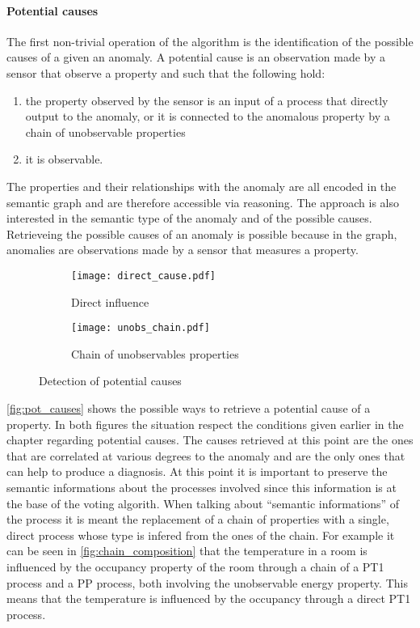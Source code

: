 \paragraph{Potential causes}
The first non-trivial operation of the algorithm is the identification of the possible causes of a given an anomaly. A potential cause is an observation made by a sensor that observe a property and such that the following hold:
\begin{enumerate}
  \item the property observed by the sensor is an input of a process that directly output to the anomaly, or it is connected to the anomalous property by a chain of unobservable properties
  \item it is observable.
\end{enumerate}
The properties and their relationships with the anomaly are all encoded in the semantic graph and are therefore accessible via reasoning. The approach is also interested in the semantic type of the anomaly and of the possible causes.
Retrieveing the possible causes of an anomaly is possible because in the graph, anomalies are observations made by a sensor that measures a property.
\begin{figure}
  \begin{subfigure}[b]{\textwidth}
    \centering
      \texttt{[image: direct\_cause.pdf]}
      \caption{Direct influence}
      \label{fig:direct_influence}
  \end{subfigure}
  \begin{subfigure}[b]{\textwidth}
    \centering
      \texttt{[image: unobs\_chain.pdf]}
      \caption{Chain of unobservables properties}
      \label{fig:chain_unobs}
  \end{subfigure}
  \caption{Detection of potential causes}
  \label{fig:pot_causes}
\end{figure}
\autoref{fig:pot_causes} shows the possible ways to retrieve a potential cause of a property. In both figures the situation respect the conditions given earlier in the chapter regarding potential causes.
The causes retrieved at this point are the ones that are correlated at various degrees to the anomaly and are the only ones that can help to produce a diagnosis. At this point it is important to preserve the semantic informations about the processes involved since this information is at the base of the voting algorith. When talking about ``semantic informations'' of the process it is meant the replacement of a chain of properties with a single, direct process whose type is infered from the ones of the chain. For example it can be seen in \autoref{fig:chain_composition} that the temperature in a room is influenced by the occupancy property of the room through a chain of a PT1 process and a PP process, both involving the unobservable energy property. This means that the temperature is influenced by the occupancy through a direct PT1 process.

